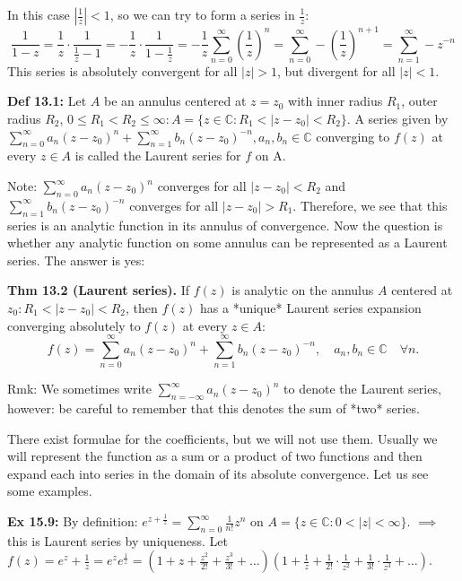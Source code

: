 \documentclass{article}
\begin{document}
In this case $|\frac{1}{z}| < 1$, so we can try to form a series in $\frac{1}{z}$:
$$ \frac{1}{1-z} = \frac{1}{z} \cdot \frac{1}{\frac{1}{z} - 1} = -\frac{1}{z} \cdot \frac{1}{1 - \frac{1}{z}} = -\frac{1}{z} \sum_{n=0}^{\infty} \left(\frac{1}{z}\right)^n = \sum_{n=0}^{\infty} -\left(\frac{1}{z}\right)^{n+1} = \sum_{n=1}^{\infty} -z^{-n} $$
This series is absolutely convergent for all $|z| > 1$, but divergent for all $|z| < 1$.

\textbf{Def 13.1:} Let $A$ be an annulus centered at $z = z_0$ with inner radius $R_1$, outer radius $R_2$, $0 \leq R_1 < R_2 \leq \infty: A = \{z \in \mathbb{C}: R_1 < |z - z_0| < R_2\}$. A series given by $\sum_{n=0}^{\infty} a_n (z - z_0)^n + \sum_{n=1}^{\infty} b_n (z - z_0)^{-n}, a_n, b_n \in \mathbb{C}$ converging to $f(z)$ at every $z \in A$ is called the Laurent series for $f$ on A.

Note: $\sum_{n=0}^{\infty} a_n (z - z_0)^n$ converges for all $|z - z_0| < R_2$ and $\sum_{n=1}^{\infty} b_n (z - z_0)^{-n}$ converges for all $|z - z_0| > R_1$. Therefore, we see that this series is an analytic function in its annulus of convergence. Now the question is whether any analytic function on some annulus can be represented as a Laurent series. The answer is yes:

\textbf{Thm 13.2 (Laurent series).} If $f(z)$ is analytic on the annulus $A$ centered at $z_0: R_1 < |z - z_0| < R_2$, then $f(z)$ has a *unique* Laurent series expansion converging absolutely to $f(z)$ at every $z \in A$:
$$ f(z) = \sum_{n=0}^{\infty} a_n (z - z_0)^n + \sum_{n=1}^{\infty} b_n (z - z_0)^{-n}, \quad a_n, b_n \in \mathbb{C} \quad \forall n. $$

Rmk: We sometimes write $\sum_{n=-\infty}^{\infty} a_n (z - z_0)^n$ to denote the Laurent series, however: be careful to remember that this denotes the sum of *two* series.

There exist formulae for the coefficients, but we will not use
them. Usually we will represent the function as a sum or a product of two functions and then expand each into series in the domain of its absolute convergence. Let us see some examples.

\textbf{Ex 15.9:} By definition: $e^{z + \frac{1}{z}} = \sum_{n=0}^{\infty} \frac{1}{n!} z^n$ on $A = \{z \in \mathbb{C}: 0 < |z| < \infty\}$.
$\implies$ this is Laurent series by uniqueness. Let $f(z) = e^z + \frac{1}{z} = e^z e^{\frac{1}{z}} = \left(1 + z + \frac{z^2}{2!} + \frac{z^3}{3!} + \dots \right)\left(1 + \frac{1}{z} + \frac{1}{2!} \cdot \frac{1}{z^2} + \frac{1}{3!} \cdot \frac{1}{z^3} + \dots \right)$.
\end{document}
